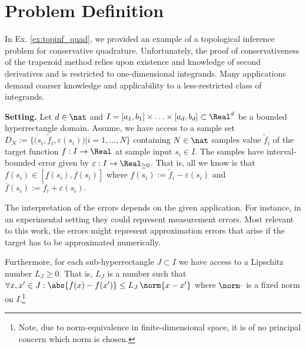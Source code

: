 

\section{Problem Definition}
\label{sec:prob_def}
In Ex. \ref{ex:topinf_quad}, we provided an example of a topological inference problem for conservative quadrature. Unfortunately, the proof of conservativeness of the trapezoid method relies upon existence and knowledge of second derivatives and is restricted to one-dimensional integrands. Many applications demand coarser knowledge and applicability to a less-restricted class of integrands. 




\textbf{Setting.}
Let $d \in \nat$ and $I=[a_1,b_1] \times \ldots \times [a_d,b_d] \subset \Real^d$ be a bounded hyperrectangle domain. Assume, we have access to a sample set $D_N:= \{\bigl( s_i, \tilde f_i, \varepsilon(s_i) \bigr) \vert i=1,\ldots, N \} $ containing $N \in \nat$ samples value $\tilde f_i$ of the target function $f: I \to \Real$ at sample input $s_i \in I$. The samples have interval-bounded error given by $\varepsilon : I \to \Real_{\geq 0}$. That is, all we know is that $f(s_i) \in [\underline f(s_i), \overline f(s_i) ]$ where $\underline f(s_i) := \tilde f_i - \varepsilon(s_i)$ and $\overline f(s_i) := \tilde f_i + \varepsilon(s_i)$.

The interpretation of the errors depends on the given application. For instance, in an experimental setting they could represent measurement errors. Most relevant to this work, the errors might represent approximation errors that arise if the target has to be approximated numerically.

Furthermore, for each sub-hyperrectangle $J \subset I$ we have access to a Lipschitz number $L_J \geq 0$. That is, $L_J$ is a number such that $\forall x,x' \in J: \abs{f(x) - f(x')} \leq L_J \, \norm{ x- x'}$ where $\norm \cdot$ is a fixed norm on $I$.\footnote{Note, due to norm-equivalence in finite-dimensional space, it is of no principal concern which norm is chosen.} \\


